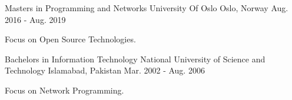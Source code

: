 

\begin{cventries}

  \cventry
    {Masters in Programming and Networks} %
    {University Of Oslo} %
    {Oslo, Norway} %
    {Aug. 2016 - Aug. 2019} %
    {
      \begin{cvitems} %
        \item {Focus on Open Source Technologies.}
      \end{cvitems}
    }
    
    
  \cventry
    {Bachelors in Information Technology} %
    {National University of Science and Technology} %
    {Islamabad, Pakistan} %
    {Mar. 2002 - Aug. 2006} %
    {
      \begin{cvitems} %
        \item {Focus on Network Programming.}
      \end{cvitems}
    }


\end{cventries}
